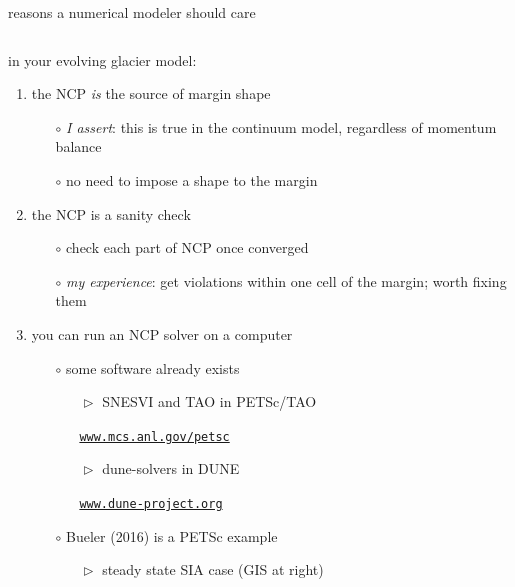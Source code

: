 \documentclass[10pt,hyperref,dvipsnames]{beamer}
\begin{document}
\begin{frame}{reasons a numerical modeler should care}

\begin{columns}
\begin{column}{0.65\textwidth}
in your evolving glacier model:
\begin{enumerate}
\item the NCP \emph{is} the source of margin shape
    \begin{itemize}
    \item[$\circ$] \emph{I assert}: this is true in the continuum model, regardless of momentum balance
    \item[$\circ$] no need to impose a shape to the margin
    \end{itemize}
\item the NCP is a sanity check
    \begin{itemize}
    \item[$\circ$] check each part of NCP once converged
    \item[$\circ$] \emph{my experience}: get violations within one cell of the margin; worth fixing them
    \end{itemize}
\item you can run an NCP solver on a computer
    \begin{itemize}
    \item[$\circ$] some software already exists
        \begin{itemize}
        \item[$\vartriangleright$] SNESVI and TAO in PETSc/TAO
        
        \href{https://www.mcs.anl.gov/petsc/}{\texttt{www.mcs.anl.gov/petsc}}
        \item[$\vartriangleright$] dune-solvers in DUNE
        
        \href{https://www.dune-project.org/modules/dune-solvers/}{\texttt{www.dune-project.org}}
        \end{itemize}                
    \item[$\circ$] Bueler (2016) is a PETSc example
        \begin{itemize}
        \item[$\vartriangleright$] steady state SIA case (GIS at right)
        \end{itemize}                
    \end{itemize}
\end{enumerate}


\end{column}
\end{columns}
\end{frame}
\end{document}
